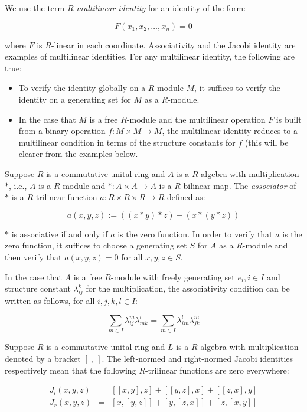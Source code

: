 \documentclass{ucetd}
\begin{document}
We use the term $R$-{\em multilinear identity} for an identity of the form:

$$F(x_1,x_2,\dots,x_n) = 0$$

where $F$ is $R$-linear in each coordinate. Associativity and the
Jacobi identity are examples of multilinear identities. For any
multilinear identity, the following are true:

\begin{itemize}
\item To verify the identity globally on a $R$-module $M$, it suffices
  to verify the identity on a generating set for $M$ as a $R$-module.
\item In the case that $M$ is a free $R$-module and the multilinear
  operation $F$ is built from a binary operation $f: M \times M \to
  M$, the multilinear identity reduces to a multilinear condition in
  terms of the structure constants for $f$ (this will be clearer from
  the examples below.
\end{itemize}

Suppose $R$ is a commutative unital ring and $A$ is a $R$-algebra with
multiplication $*$, i.e., $A$ is a $R$-module and $*:A \times A \to A$
is a $R$-bilinear map. The {\em associator} of $*$ is a $R$-trilinear
function $a: R \times R \times R \to R$ defined as:

$$a(x,y,z) := ((x * y) * z) - (x * (y * z))$$

$*$ is associative if and only if $a$ is the zero function. In order
to verify that $a$ is the zero function, it suffices to choose a
generating set $S$ for $A$ as a $R$-module and then verify that
$a(x,y,z) = 0$ for all $x,y,z \in S$.

In the case that $A$ is a free $R$-module with freely generating set
$e_i, i \in I$ and structure constant $\lambda_{ij}^k$ for the
multiplication, the associativity condition can be written as follows,
for all $i,j,k,l \in I$:

$$\sum_{m \in I} \lambda_{ij}^m\lambda_{mk}^l = \sum_{m \in I} \lambda_{im}^l \lambda_{jk}^m$$

Suppose $R$ is a commutative unital ring and $L$ is a $R$-algebra with
multiplication denoted by a bracket $[ \ , \ ]$. The left-normed and
right-normed Jacobi identities respectively mean that the following
$R$-trilinear functions are zero everywhere:

\begin{eqnarray*}
  J_l(x,y,z) & = & [[x,y],z] + [[y,z],x] + [[z,x],y]\\
  J_r(x,y,z) & = & [x,[y,z]] + [y,[z,x]] + [z,[x,y]]\\
\end{eqnarray*}
\end{document}
